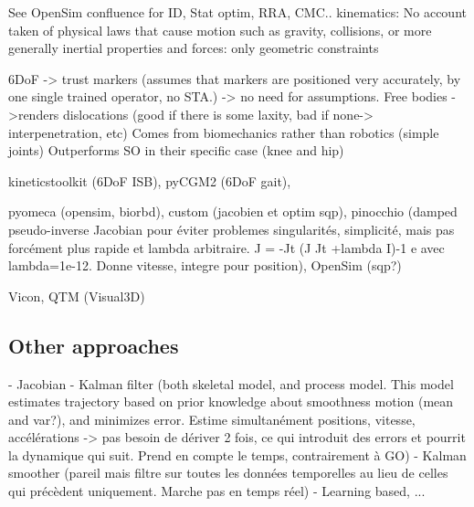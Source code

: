 See OpenSim confluence for ID, Stat optim, RRA, CMC..
kinematics: No account taken of physical laws that cause motion such as gravity, collisions, or more generally inertial properties and forces: only geometric constraints



6DoF
-> trust markers (assumes that markers are positioned very accurately, by one single trained operator, no STA.)
-> no need for assumptions. Free bodies
->renders dislocations (good if there is some laxity, bad if none-> interpenetration, etc) Comes from biomechanics rather than robotics (simple joints)
Outperforms SO in their specific case (knee and hip) \cite{Lu1999}





kineticstoolkit (6DoF ISB), pyCGM2 (6DoF gait), 

pyomeca (opensim, biorbd), custom (jacobien et optim sqp), pinocchio (damped pseudo-inverse Jacobian pour éviter problemes singularités, simplicité, mais pas forcément plus rapide et lambda arbitraire. J = -Jt (J Jt +lambda I)-1 e avec lambda=1e-12. Donne vitesse, integre pour position), OpenSim (sqp?)

Vicon, QTM (Visual3D)






\subsection{Other approaches}

\cite{DeGroote2008,Aristidou2017}
- Jacobian
- Kalman filter (both skeletal model, and process model. This model estimates trajectory based on prior knowledge about smoothness motion (mean and var?), and minimizes error. Estime simultanément positions, vitesse, accélérations -> pas besoin de dériver 2 fois, ce qui introduit des errors et pourrit la dynamique qui suit. Prend en compte le temps, contrairement à GO)
- Kalman smoother (pareil mais filtre sur toutes les données temporelles au lieu de celles qui précèdent uniquement. Marche pas en temps réel)
- Learning based, ...


 



